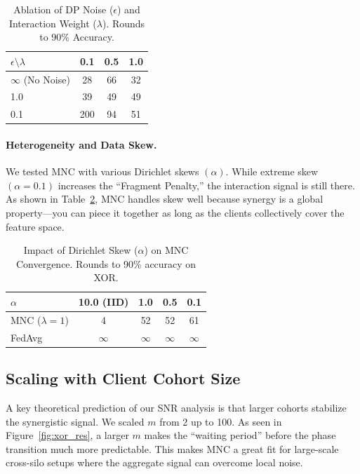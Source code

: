 \documentclass{article}
\theoremstyle{plain}
\theoremstyle{definition}
\begin{document}
\begin{table}[t]
\caption{Ablation of DP Noise ($\epsilon$) and Interaction Weight ($\lambda$). Rounds to 90\% Accuracy.}
\label{tab:ablation}
\begin{center}
\begin{small}
\begin{tabular}{lccc}
\toprule
$\epsilon \setminus \lambda$ & 0.1 & 0.5 & 1.0 \\
\midrule
$\infty$ (No Noise) & 28 & 66 & 32 \\
1.0 & 39 & 49 & 49 \\
0.1 & 200 & 94 & 51 \\
\bottomrule
\end{tabular}
\end{small}
\end{center}
\end{table}

\paragraph{Heterogeneity and Data Skew.} We tested MNC with various Dirichlet skews $(\alpha)$. While extreme skew $(\alpha=0.1)$ increases the ``Fragment Penalty,'' the interaction signal is still there. As shown in Table~\ref{tab:hetero}, MNC handles skew well because synergy is a global property—you can piece it together as long as the clients collectively cover the feature space.

\begin{table}[t]
\caption{Impact of Dirichlet Skew ($\alpha$) on MNC Convergence. Rounds to 90\% accuracy on XOR.}
\label{tab:hetero}
\begin{center}
\begin{small}
\setlength{\tabcolsep}{3pt}
\begin{tabular}{lcccc}
\toprule
$\alpha$ & 10.0 (IID) & 1.0 & 0.5 & 0.1 \\
\midrule
MNC ($\lambda=1$) & 4 & 52 & 52 & 61 \\
FedAvg & $\infty$ & $\infty$ & $\infty$ & $\infty$ \\
\bottomrule
\end{tabular}
\end{small}
\end{center}
\end{table}



\subsection{Scaling with Client Cohort Size}
A key theoretical prediction of our SNR analysis is that larger cohorts stabilize the synergistic signal. We scaled $m$ from 2 up to 100. As seen in Figure~\ref{fig:xor_res}, a larger $m$ makes the ``waiting period'' before the phase transition much more predictable. This makes MNC a great fit for large-scale cross-silo setups where the aggregate signal can overcome local noise.
\end{document}
